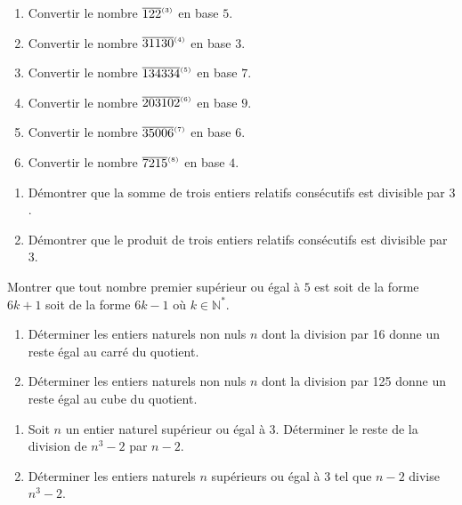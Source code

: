%
\begin{exo}\label{exo:arith-4}
	\begin{enumerate}
		\item Convertir le nombre $\overline{122}^{_{(3)}}$ en base $ 5 $.
		\item Convertir le nombre $\overline{31130}^{_{(4)}}$ en base $ 3 $.
		\item Convertir le nombre $\overline{134334}^{_{(5)}}$ en base $ 7 $.
		\item Convertir le nombre $\overline{203102}^{_{(6)}}$ en base $ 9 $.
		\item Convertir le nombre $\overline{35006}^{_{(7)}}$ en base $ 6 $.
		\item Convertir le nombre $\overline{7215}^{_{(8)}}$ en base $ 4 $.
	\end{enumerate}
\end{exo}
%
\begin{exo}\label{exo:arith-5}
      \begin{enumerate}
            \item D\'emontrer que la somme de trois entiers relatifs cons\'ecutifs est divisible par $3$.
            \item D\'emontrer que le produit de trois entiers relatifs cons\'ecutifs est divisible par $3$.
      \end{enumerate}
\end{exo}
%
\begin{exo}\label{exo:arith-6}
      Montrer que tout nombre premier sup\'erieur ou \'egal \`a $5$ est 
      soit de la forme $6 k + 1$ soit de la forme $6 k -1$ o\`u $k\in\mathbb{N}^*$.
\end{exo}
%
\begin{exo}\label{exo:arith-7}
      \begin{enumerate}
            \item D\'eterminer les entiers naturels non nuls $n$ dont 
                  la division par 16 donne un reste \'egal au carr\'e du quotient.
            \item D\'eterminer les entiers naturels non nuls $n$ dont
                  la division par 125 donne un reste \'egal au cube du quotient.
      \end{enumerate}
\end{exo}
%
\begin{exo}\label{exo:arith-8}
      \begin{enumerate}
            \item Soit $n$ un entier naturel sup\'erieur ou \'egal \`a 3. 
                  D\'eterminer le reste de la division de $n^3 - 2 $ par $n-2$.
            \item D\'eterminer les entiers naturels $n$ sup\'erieurs ou \'egal \`a 3 tel que $n -2 $ divise $n^3 - 2$.
      \end{enumerate}
\end{exo}
